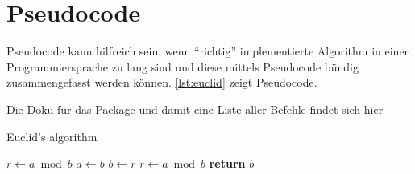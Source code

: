 \clearpage %

\section{Pseudocode}
Pseudocode kann hilfreich sein, wenn \enquote{richtig} implementierte Algorithm in einer Programmiersprache zu lang sind und diese mittels Pseudocode bündig zusammengefasst werden können. \autoref{lst:euclid} zeigt Pseudocode.

Die Doku für das Package und damit eine Liste aller Befehle findet sich 
\href{http://tug.ctan.org/macros/latex/contrib/algorithmicx/algorithmicx.pdf}{hier}

\begin{algorithm}
	\caption{Euclid's algorithm}\label{lst:euclid}
	\begin{algorithmic}[1]
			\State $r\gets a\bmod b$
				\State $a\gets b$
				\State $b\gets r$
				\State $r\gets a\bmod b$
			\EndWhile\label{euclidendwhile}
			\State \textbf{return} $b$
		\EndProcedure
	\end{algorithmic}
\end{algorithm}